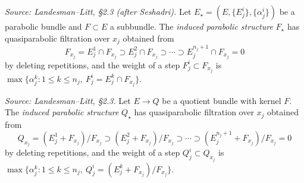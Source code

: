 \begin{definition}
  \label{def:induced-subbundle}
  \textit{Source: Landesman--Litt, \S2.3 (after Seshadri).}
  Let $E_\star = (E, \{E^i_j\}, \{\alpha^i_j\})$ be a parabolic bundle and
  $F \subset E$ a subbundle. The \emph{induced parabolic structure} $F_\star$ has
  quasiparabolic filtration over $x_j$ obtained from
  \[
    F_{x_j} = E^1_j \cap F_{x_j} \supset E^2_j \cap F_{x_j} \supset \cdots
      \supset E^{n_j+1}_j \cap F_{x_j} = 0
  \]
  by deleting repetitions, and the weight of a step $F^i_j \subset F_{x_j}$ is
  $\max\{ \alpha^k_j : 1 \leq k \leq n_j,\ F^i_j = E^k_j \cap F_{x_j}\}$.
\end{definition}

\begin{definition}
  \label{def:induced-quotient}
  \textit{Source: Landesman--Litt, \S2.3.}
  Let $E \to Q$ be a quotient bundle with kernel $F$. The \emph{induced
  parabolic structure} $Q_\star$ has quasiparabolic filtration over $x_j$
  obtained from
  \[
    Q_{x_j} = (E^1_j + F_{x_j})/F_{x_j} \supset (E^2_j + F_{x_j})/F_{x_j} \supset
      \cdots \supset (E^{n_j+1}_j + F_{x_j})/F_{x_j} = 0
  \]
  by deleting repetitions, and the weight of a step $Q^i_j \subset Q_{x_j}$ is
  $\max\{ \alpha^k_j : 1 \leq k \leq n_j,\ Q^i_j = (E^k_j + F_{x_j})/F_{x_j}\}$.
\end{definition}

